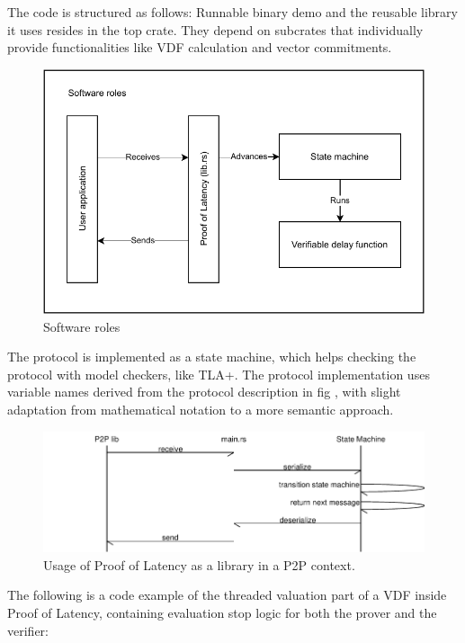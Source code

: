 The code is structured as follows: Runnable binary demo and the reusable library it uses resides in the top crate. They depend on subcrates that individually provide functionalities like VDF calculation and vector commitments.

\begin{figure}
	\includegraphics[width=\textwidth]{pictures/PoL_software_roles.pdf}
	\caption{Software roles}
	\label{software_roles}
\end{figure}

The protocol is implemented as a state machine, which helps checking the protocol with model checkers, like TLA+. %
 The protocol implementation uses variable names derived from the protocol description in fig %
 , with slight adaptation from mathematical notation to a more semantic approach.

\begin{figure}
	\includegraphics[width=\textwidth]{pictures/message_flow-eps-converted-to.pdf}
	\caption{Usage of Proof of Latency as a library in a P2P context.}
	\label{message_flow}
\end{figure}

The following is a code example of the threaded valuation part of a VDF inside Proof of Latency, containing evaluation stop logic for both the prover and the verifier:


